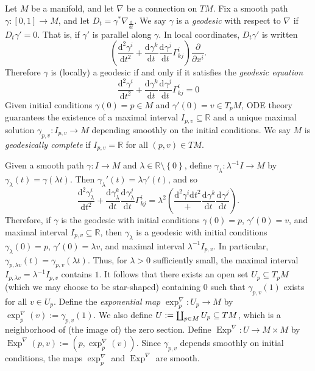 \documentclass{book}
\newcommand{\bbR}{\mathbb{R}}
\renewcommand{\d}{\mathrm{d}}
\newcommand{\set}[1]{\left\{ {#1} \right\}}
\newcommand{\parens}[1]{\left( {#1} \right)}
\newcommand{\pdv}[2]{\frac{\partial{#1}}{\partial{#2}}}
\newcommand{\odv}[3][]{\frac{\d^{#1}#2}{\d{#3}^{#1}}}
\DeclareMathOperator{\Exp}{\mathrm{Exp}}
\DeclareRobustCommand{\coprod}{\mathop{\text{\fakecoprod}}}
\newcommand{\fakecoprod}{%
  \sbox0{$\prod$}%
  \smash{\raisebox{\dimexpr.9625\depth-\dp0}{\scalebox{1}[-1]{$\prod$}}}%
  \vphantom{$\prod$}%
}
\theoremstyle{definition}
\numberwithin{equation}{section}
\begin{document}
Let $M$ be a manifold, and let $\nabla$ be a connection on $TM$. Fix a smooth path $\gamma \colon [0,1] \to M$, and let $D_t = \gamma^* \nabla_{\odv{}{t}}$. We say $\gamma$ is a \textit{geodesic} with respect to $\nabla$ if $D_t \gamma' = 0$. That is, if $\gamma'$ is parallel along $\gamma$. In local coordinates, $D_t \gamma'$ is written 
\begin{equation}
    \parens{ \frac{\d^2\gamma^i}{\d{t}^2} + \odv{\gamma^k}{t} \odv{\gamma^j}{t} \Gamma_{kj}^i } \pdv{}{x^i}.
\end{equation}
Therefore $\gamma$ is (locally) a geodesic if and only if it satisfies the \textit{geodesic equation}
\begin{equation}
    \frac{\d^2\gamma^i}{\d{t}^2} + \odv{\gamma^k}{t} \odv{\gamma^j}{t} \Gamma_{kj}^i = 0
\end{equation}
Given initial conditions $\gamma(0) = p \in M$ and $\gamma'(0) = v \in T_pM$, ODE theory guarantees the existence of a maximal interval $I_{p,v} \subseteq \bbR$ and a unique maximal solution $\gamma_{p,v} \colon I_{p,v} \to M$ depending smoothly on the initial conditions. We say $M$ is \textit{geodesically complete} if $I_{p,v} = \bbR$ for all $(p,v) \in TM$.

Given a smooth path $\gamma \colon I \to M$ and $\lambda \in \bbR \setminus \set{0}$, define $\gamma_\lambda \colon \lambda^{-1} I \to M$ by $\gamma_\lambda(t) = \gamma(\lambda t)$. Then $\gamma_\lambda'(t) = \lambda \gamma'(t)$, and so 
\begin{equation}
    \frac{\d^2{\gamma_\lambda^i}}{\d{t}^2} + \odv{\gamma_\lambda^k}{t} \odv{\gamma_\lambda^j}{t} \Gamma_{kj}^i
    = \lambda^2 \parens{ \frac{\d^2{\gamma^i}{\d{t}^2}} + \odv{\gamma^k}{t} \odv{\gamma^j}{t} }.
\end{equation}
Therefore, if $\gamma$ is the geodesic with initial conditions $\gamma(0) = p$, $\gamma'(0) = v$, and maximal interval $I_{p,v} \subseteq \bbR$, then $\gamma_\lambda$ is a geodesic with initial conditions $\gamma_\lambda(0) = p$, $\gamma'(0) = \lambda v$, and maximal interval $\lambda^{-1} I_{p,v}$. In particular, $\gamma_{p,\lambda v}(t) = \gamma_{p,v}(\lambda t)$. Thus, for $\lambda > 0$ sufficiently small, the maximal interval $I_{p,\lambda v} = \lambda^{-1} I_{p,v}$ contains $1$. It follows that there exists an open set $U_p \subseteq T_pM$ (which we may choose to be star-shaped) containing $0$ such that $\gamma_{p,v}(1)$ exists for all $v \in U_p$. Define the \textit{exponential map} $\exp_p^\nabla \colon U_p \to M$ by $\exp_p^\nabla(v) := \gamma_{p,v}(1)$. We also define $U := \coprod_{p \in M} U_p \subseteq TM$, which is a neighborhood of (the image of) the zero section. Define $\Exp^\nabla \colon U \to M \times M$ by $\Exp^\nabla(p,v) := (p,\exp_p^\nabla(v))$. Since $\gamma_{p,v}$ depends smoothly on initial conditions, the maps $\exp_p^\nabla$ and $\Exp^\nabla$ are smooth. 
\end{document}
